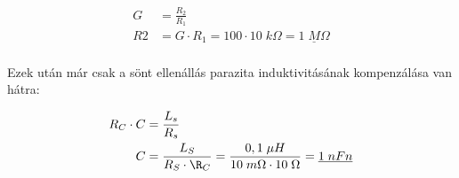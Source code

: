 \begin{equation}
\begin{aligned}{}
    G &= \frac{R_2}{R_1} \\
    R2 &= G \cdot R_1 = 100 \cdot 10\;k\Omega = \underline{1\;M\Omega} \\
\end{aligned}
\end{equation}

Ezek után már csak a sönt ellenállás parazita induktivitásának kompenzálása van hátra:


\begin{equation}
\begin{aligned}{}
    R_C \cdot C &= \frac{L_s}{R_s} \\
    C &= \frac{L_S}{R_S \cdot \R_C} = \frac{0,1\;\mu{H}}{10\;m\Omega \cdot 10\;\Omega} = \underline{1\;nFn} \\
\end{aligned}
\end{equation}